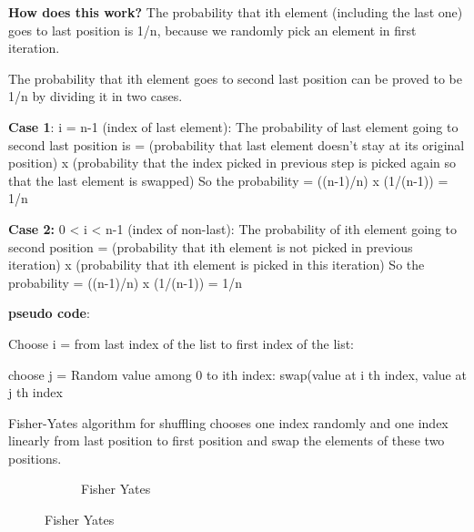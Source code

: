 \textbf{How does this work?}
The probability that ith element (including the last one) goes to last position is 1/n, because we randomly pick an element in first iteration.

The probability that ith element goes to second last position can be proved to be 1/n by dividing it in two cases.

\textbf{Case 1}: i = n-1 (index of last element):
The probability of last element going to second last position is = (probability that last element doesn’t stay at its original position) x (probability that the index picked in previous step is picked again so that the last element is swapped)
So the probability = ((n-1)/n) x (1/(n-1)) = 1/n

\textbf{Case 2:} 0 < i < n-1 (index of non-last):
The probability of ith element going to second position = (probability that ith element is not picked in previous iteration) x (probability that ith element is picked in this iteration)
So the probability = ((n-1)/n) x (1/(n-1)) = 1/n




\textbf{pseudo code}:

     Choose i = from last index of the list to first index of the list:
     
     choose j = Random value among 0 to ith index:
     swap(value at i th index, value at j th index

Fisher-Yates algorithm for shuffling chooses one index randomly and one index linearly from last position to first position and swap the elements of these two positions.


\begin{figure}
\centering
\begin{subfigure}
\texttt{[image: report/fy1.jpeg]}
\label{chap3Fig:1}
\end{subfigure}
\begin{subfigure}
\texttt{[image: report/fy2.jpeg]}
\end{subfigure}
\begin{subfigure}
\texttt{[image: report/fy3.jpeg]}
\end{subfigure}
\begin{subfigure}
\texttt{[image: report/fy4.jpeg]}
\end{subfigure}
\begin{subfigure}
\texttt{[image: report/fy5.jpeg]}
\caption{Fisher Yates}
\end{subfigure}
\end{figure}



